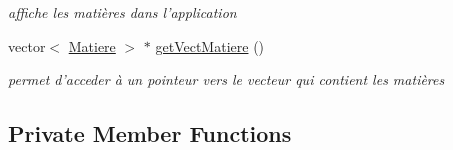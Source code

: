 \begin{DoxyCompactItemize}
\begin{DoxyCompactList}\small\item\em affiche les matières dans l'application \end{DoxyCompactList}\item 
vector$<$ \hyperlink{class_matiere}{Matiere} $>$ $\ast$ \hyperlink{class_application_a117d490f9c6fcfb70f561ad91b92aa20}{get\-Vect\-Matiere} ()
\begin{DoxyCompactList}\small\item\em permet d'acceder à un pointeur vers le vecteur qui contient les matières \end{DoxyCompactList}\end{DoxyCompactItemize}
\subsection*{Private Member Functions}
